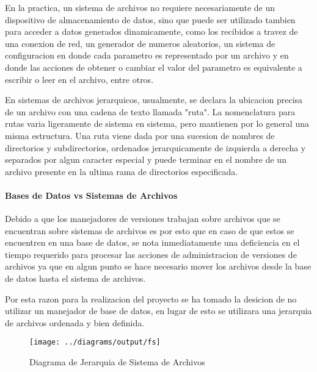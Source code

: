En la practica, un sistema de archivos no requiere necesariamente de un dispositivo de almacenamiento de datos, sino que puede ser utilizado tambien para acceder a datos generados dinamicamente, como los recibidos a travez de una conexion de red, un generador de numeros aleatorios, un sistema de configuracion en donde cada parametro es representado por un archivo y en donde las acciones de obtener o cambiar el valor del parametro es equivalente a escribir o leer en el archivo, entre otros.

En sistemas de archivos jerarquicos, usualmente, se declara la ubicacion precisa de un archivo con una cadena de texto llamada "ruta". La nomenclatura para rutas varia ligeramente de sistema en sistema, pero mantienen por lo general una misma estructura. Una ruta viene dada por una sucesion de nombres de directorios y subdirectorios, ordenados jerarquicamente de izquierda a derecha y separados por algun caracter especial y puede terminar en el nombre de un archivo presente en la ultima rama de directorios especificada.

\paragraph{Bases de Datos vs Sistemas de Archivos}


Debido a que los manejadores de versiones trabajan sobre archivos que se encuentran sobre sistemas de archivos es por esto que en caso de que estos se encuentren en una base de datos, se nota inmediatamente una deficiencia en el tiempo requerido para procesar las acciones de administracion de versiones de archivos ya que en algun punto se hace necesario mover los archivos desde la base de datos hasta el sistema de archivos.

Por esta razon para la realizacion del proyecto se ha tomado la desicion de no utilizar un manejador de base de datos, en lugar de esto se utilizara una jerarquia de archivos ordenada y bien definida.

\begin{figure}
 \centering
 \texttt{[image: ../diagrams/output/fs]}
 \caption{Diagrama de Jerarquia de Sistema de Archivos}
 \label{diagrama:fs}
\end{figure}

